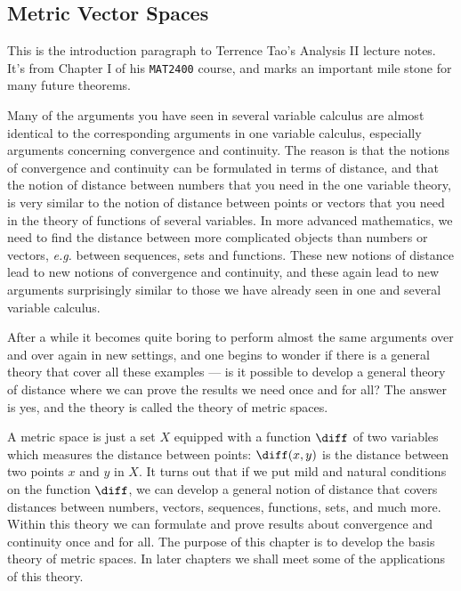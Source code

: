 \subsection{Metric Vector Spaces}\label{subsec-metric-spaces}

\begin{rem}
	This is the introduction paragraph to Terrence Tao's Analysis II lecture notes.
	It's from Chapter I of his \texttt{MAT2400} course, and marks an important mile
	stone for many future theorems.
	\begin{displayquote}
		Many of the arguments you have seen in several variable calculus are almost
		identical to the corresponding arguments in one variable calculus, especially
		arguments concerning convergence and continuity. The reason is that the notions
		of convergence and continuity can be formulated in terms of distance, and that
		the notion of distance between numbers that you need in the one variable theory,
		is very similar to the notion of distance between points or vectors that you need
		in the theory of functions of several variables. In more advanced mathematics,
		we need to find the distance between more complicated objects than numbers or vectors,
		\textit{e.g.} between sequences, sets and functions. These new notions of distance
		lead to new notions of convergence and continuity, and these again lead to new
		arguments surprisingly similar to those we have already seen in one and several
		variable calculus. \par
		After a while it becomes quite boring to perform almost the same arguments over
		and over again in new settings, and one begins to wonder if there is a general
		theory that cover all these examples --- is it possible to develop a
		general theory of distance where we can prove the results we need once and for all?
		The answer is yes, and the theory is called the theory of metric spaces. \par
		A metric space is just a set $X$ equipped with a function $\diff$ of two variables
		which measures the distance between points: $\diff(x,y)$ is the distance between
		two points $x$ and $y$ in $X$. It turns out that if we put mild and natural conditions
		on the function $\diff$, we can develop a general notion of distance that covers
		distances between numbers, vectors, sequences, functions, sets, and much more. Within
		this theory we can formulate and prove results about convergence and continuity once
		and for all. The purpose of this chapter is to develop the basis theory of metric spaces.
		In later chapters we shall meet some of the applications of this theory.
	\end{displayquote}
\end{rem}

